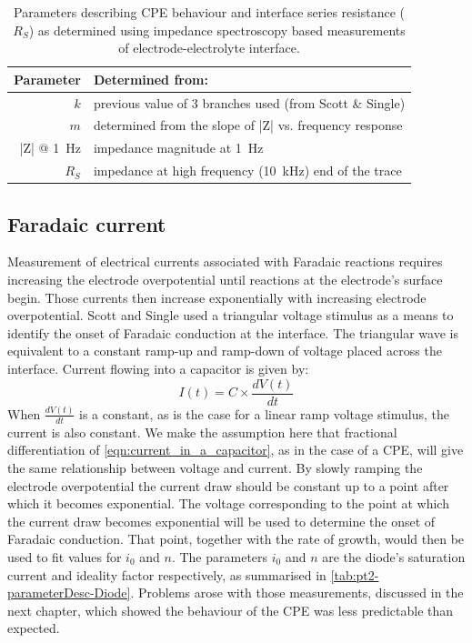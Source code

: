    \begin{table}
      \begin{center}
        \begin{tabular} {r | l}
          Parameter & Determined from:\\
          \hline
          $k$ & previous value of 3 branches used (from Scott \& Single)\\
          $m$ & determined from the slope of |Z| vs. frequency response\\
          |Z| @ \SI{1}{\hertz} & impedance magnitude at \SI{1}{\hertz}\\
          $R_S$ & impedance at high frequency (\SI{10}{\kilo\hertz}) end of the trace
        \end{tabular}
      \end{center}
      \caption{\label{tab:pt2-parameterDesc-CPE}Parameters describing CPE behaviour and interface series resistance ($R_S$) as determined using impedance spectroscopy based measurements of electrode-electrolyte interface.}
    \end{table}


  \subsection{Faradaic current}


    Measurement of electrical currents associated with Faradaic reactions requires increasing the electrode overpotential until reactions at the electrode's surface begin.
    Those currents then increase exponentially with increasing electrode overpotential.
    Scott and Single used a triangular voltage stimulus as a means to identify the onset of Faradaic conduction at the interface.
    The triangular wave is equivalent to a constant ramp-up and ramp-down of voltage placed across the interface.
    Current flowing into a capacitor is given by:
    \begin{equation}
      I(t) = C \times \frac{dV(t)}{dt}
      \label{eqn:current_in_a_capacitor}
    \end{equation}
    When $\frac{dV(t)}{dt}$ is a constant, as is the case for a linear ramp voltage stimulus, the current is also constant.
    We make the assumption here that fractional differentiation of \cref{eqn:current_in_a_capacitor}, as in the case of a CPE, will give the same relationship between voltage and current.
    By slowly ramping the electrode overpotential the current draw should be constant up to a point after which it becomes exponential.
    The voltage corresponding to the point at which the current draw becomes exponential will be used to determine the onset of Faradaic conduction.
    That point, together with the rate of growth, would then be used to fit values for $i_0$ and $n$.
    The parameters $i_0$ and $n$ are the diode's saturation current and ideality factor respectively, as summarised in \cref{tab:pt2-parameterDesc-Diode}.
    Problems arose with those measurements, discussed in the next chapter, which showed the behaviour of the CPE was less predictable than expected.

